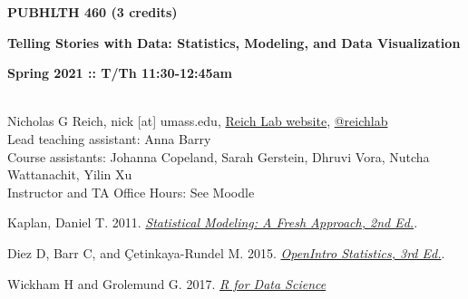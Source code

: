 \documentclass[10pt]{article}
\begin{document}
\centerline{\bf \large PUBHLTH 460 (3 credits)} 
\centerline{\bf \large Telling Stories with Data: Statistics, Modeling, and Data Visualization}
\centerline{\bf Spring 2021 :: T/Th 11:30-12:45am  }

\vspace{.25in}
\\
\noindent Nicholas G Reich,  nick [at] umass.edu,  \href{http://reichlab.github.io}{Reich Lab website},  \href{https://twitter.com/reichlab}{@reichlab}\\
\noindent Lead teaching assistant: Anna Barry\\
\noindent Course assistants: 
Johanna Copeland, Sarah Gerstein, Dhruvi Vora, Nutcha Wattanachit, Yilin Xu\\
\noindent Instructor and TA Office Hours: See Moodle






\bigskip
{}


Kaplan, Daniel T. 2011. \emph{\href{https://www.amazon.com/STATISTICAL-MODELING-Daniel-T-Kaplan-dp-0983965870/dp/0983965870/}{Statistical Modeling: A Fresh Approach, 2nd Ed.}}. 


  
  
Diez D, Barr C, and \c{C}etinkaya-Rundel M. 2015. \emph{\href{http://www.openintro.org/stat/index.php}{OpenIntro Statistics, 3rd Ed.}}.

Wickham H and Grolemund G. 2017. \emph{\href{https://r4ds.had.co.nz/index.html}{R for Data Science}}
\end{document}
